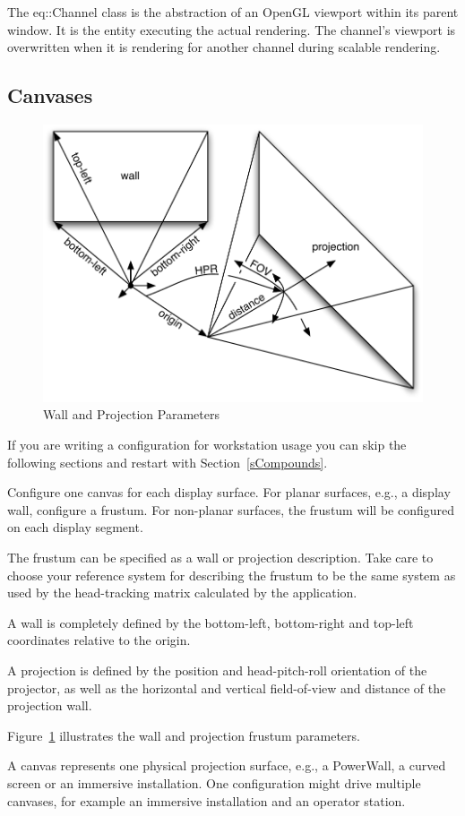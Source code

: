 \documentclass[10pt,a4]{scrartcl}
\newcommand{\fig}[1]{Figure~\ref{#1}}
\newcommand{\sref}[1]{Section~\ref{#1}}
\begin{document}
The \textsf{eq::Channel} class is the abstraction of an OpenGL viewport
within its parent window. It is the entity executing the actual
rendering. The channel's viewport is overwritten when it is rendering
for another channel during scalable rendering.


\subsection{\label{sCanvas}Canvases}

\begin{figure}
  \includegraphics[width=.618\textwidth]{images/frusta.pdf}
  {\caption{\label{fFrusta}Wall and Projection Parameters}}
\end{figure}
If you are writing a configuration for workstation usage you can skip
the following sections and restart with \sref{sCompounds}.

Configure one \textsf{canvas} for each display surface. For planar
surfaces, e.g., a display wall, configure a frustum. For non-planar
surfaces, the frustum will be configured on each display segment.

The frustum can be specified as a wall or projection description. Take
care to choose your reference system for describing the frustum to be
the same system as used by the head-tracking matrix calculated by the
application.

A wall is completely defined by the bottom-left, bottom-right and
top-left coordinates relative to the origin.

A projection is defined by the position and head-pitch-roll orientation
of the projector, as well as the horizontal and vertical field-of-view
and distance of the projection wall.

\fig{fFrusta} illustrates the wall and projection frustum parameters.

A canvas represents one physical projection surface, e.g., a PowerWall, a
curved screen or an immersive installation. One configuration might
drive multiple canvases, for example an immersive installation and an
operator station.
\end{document}
